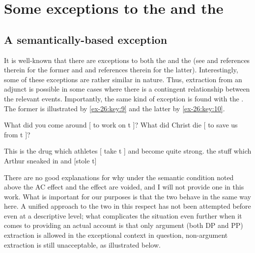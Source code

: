 \documentclass[output=paper]{langsci/langscibook}
\begin{document}
\section{Some exceptions to the  and the }

\subsection{A semantically-based exception}

It is well-known that there are exceptions to both the  and the 
(see \citealt{Truswell2011} and references therein for the former and
\citealt{Postal1998} and
references therein for the latter). Interestingly, some of these exceptions are
rather similar in nature. Thus, extraction from an adjunct is possible in some
cases where there is a contingent relationship between the relevant events.
Importantly, the same kind of exception is found with the . The former is
illustrated by \eqref{ex-26:key:9} and the latter by \eqref{ex-26:key:10}.

\ea\label{ex-26:key:9}
	\ea What did you come around [ to work on t ]?
	\ex What did Christ die [ to save us from t ]?%
        \hfill\parencite[131]{Truswell2011}
	\z
\z

\ea\label{ex-26:key:10}
	\ea This is the drug which athletes [ take t ] and become quite strong.
	\ex the stuff which Arthur sneaked in and [stole t]%
        \hfill\parencite[53]{Postal1998}
	\z
\z

There are no good explanations for why under the semantic condition noted above
the \glsdesc{AC} effect and the  effect are voided,
and I will not provide one in this work. What is important for our purposes is
that the two behave in the same way here. A unified approach to the two in this
respect has not been attempted before even at a descriptive level; what
complicates the situation even further when it comes to providing an actual
account is that only argument (both DP and PP) extraction is allowed in the
exceptional context in question, non-argument extraction is still unacceptable,
as illustrated below.

\z

\z
\end{document}
